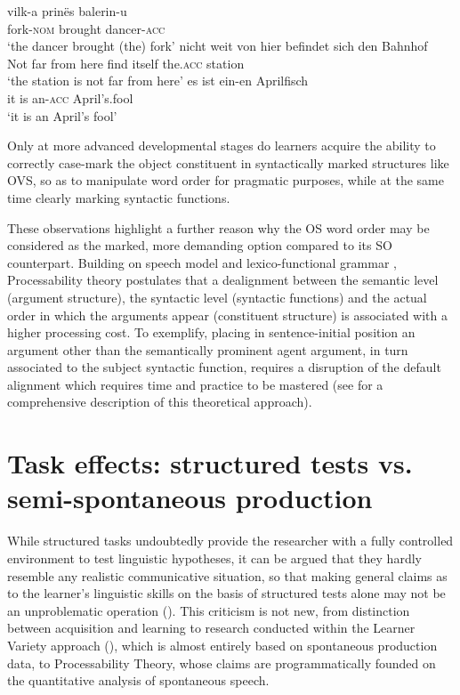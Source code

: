 \ea%
    \label{ex:01:5}
    \ea\label{ex:01:5a}
    \gll    vilk-a prinës balerin-u\\
            fork-\textsc{nom}  brought  dancer-\textsc{acc}\\
    \glt    ‘the dancer brought (the) fork’
    \ex\label{ex:01:5b}
    \gll    nicht weit von hier befindet sich den Bahnhof \\
            Not far from here  find    itself  the.\textsc{acc}  station\\
    \glt    ‘the station is not far from here’
    \ex\label{ex:01:5c}
    \gll    es ist ein-en Aprilfisch\\
            it   is   an-\textsc{acc}   April's.fool\\
    \glt    ‘it is an April's fool’
    \z
\z

Only at more advanced developmental stages do learners acquire the ability to correctly case-mark the object constituent in syntactically marked structures like OVS, so as to manipulate word order for pragmatic purposes, while at the same time clearly marking syntactic functions. 

These observations highlight a further reason why the OS word order may be considered as the marked, more demanding option compared to its SO counterpart. Building on  speech model and lexico-functional grammar \citep{Bresnan2001}, Processability theory postulates that a dealignment between the semantic level (argument structure), the syntactic level (syntactic functions) and the actual order in which the arguments appear (constituent structure) is associated with a higher processing cost. To exemplify, placing in sentence-initial position an argument other than the semantically prominent agent argument, in turn associated to the subject syntactic function, requires a disruption of the default alignment which requires time and practice to be mastered (see \citealt{BettoniDi-Biase2015} for a comprehensive description of this theoretical approach).

\section{Task effects: structured tests vs. semi-spontaneous production}\label{sec:01:2}

While structured tasks undoubtedly provide the researcher with a fully controlled environment to test linguistic hypotheses, it can be argued that they hardly resemble any realistic communicative situation, so that making general claims as to the learner’s linguistic skills on the basis of structured tests alone may not be an unproblematic operation (\citealt[289–290]{Ellis1985}). This criticism is not new, from  distinction between acquisition and learning to research conducted within the Learner Variety approach (\citealt{Perdue1993, Perdue1996, Starren2001, Bernini2003, Giacalone-Ramat2003}), which is almost entirely based on spontaneous production data, to Processability Theory, whose claims are programmatically founded on the quantitative analysis of spontaneous speech. 

